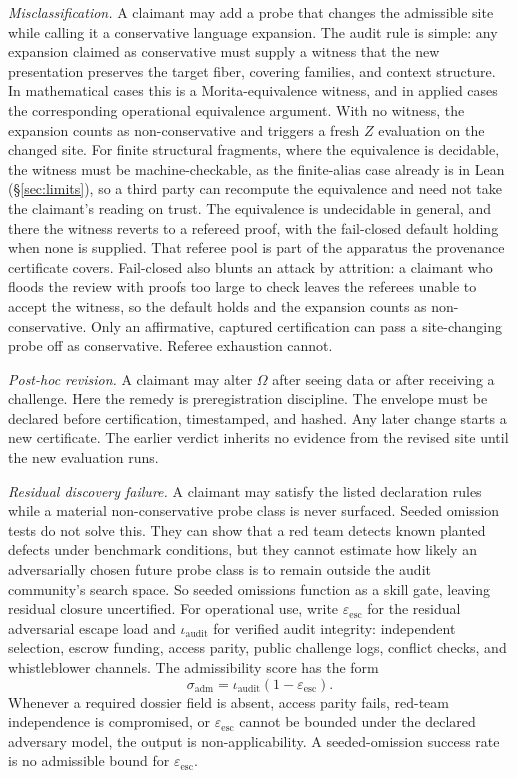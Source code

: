 \documentclass[11pt]{article}
\begin{document}
\emph{Misclassification.} A claimant may add a probe that changes the admissible
site while calling it a conservative language expansion. The audit rule is
simple: any expansion claimed as conservative must supply a witness that the new
presentation preserves the target fiber, covering families, and context
structure. In mathematical cases this is a Morita-equivalence witness, and in
applied cases the corresponding operational equivalence argument. With no
witness, the expansion counts as non-conservative and triggers a fresh $Z$
evaluation on the changed site.
For finite structural fragments, where the equivalence is decidable, the witness
must be machine-checkable, as the finite-alias case already is in Lean
(\S\ref{sec:limits}), so a third party can recompute the equivalence and need not
take the claimant's reading on trust. The equivalence is undecidable in general,
and there the witness reverts to a refereed proof, with the fail-closed default
holding when none is supplied.
That referee pool is part of the apparatus the provenance certificate covers.
Fail-closed also blunts an attack by attrition: a claimant who floods the review
with proofs too large to check leaves the referees unable to accept the witness,
so the default holds and the expansion counts as non-conservative. Only an
affirmative, captured certification can pass a site-changing probe off as
conservative. Referee exhaustion cannot.

\emph{Post-hoc revision.} A claimant may alter $\Omega$ after seeing data or
after receiving a challenge. Here the remedy is preregistration discipline. The
envelope must be declared before certification, timestamped, and hashed. Any
later change starts a new certificate. The earlier verdict inherits no evidence
from the revised site until the new evaluation runs.

\emph{Residual discovery failure.}
A claimant may satisfy the listed declaration rules while a material
non-conservative probe class is never surfaced. Seeded omission tests do not
solve this. They can show that a red team detects known planted defects under
benchmark conditions, but they cannot estimate how likely an adversarially
chosen future probe class is to remain outside the audit community's search
space. So seeded omissions function as a skill gate, leaving residual closure
uncertified. For operational use, write $\varepsilon_{\mathrm{esc}}$ for the
residual adversarial escape load and $\iota_{\mathrm{audit}}$ for verified audit
integrity: independent selection, escrow funding, access parity, public
challenge logs, conflict checks, and whistleblower channels.
The admissibility score has the form
\[
\sigma_{\mathrm{adm}} = \iota_{\mathrm{audit}}(1-\varepsilon_{\mathrm{esc}}).
\]
Whenever a required dossier field is absent, access parity fails, red-team
independence is compromised, or $\varepsilon_{\mathrm{esc}}$ cannot be bounded
under the declared adversary model, the output is non-applicability. A
seeded-omission success rate is no admissible bound for
$\varepsilon_{\mathrm{esc}}$.
\end{document}
